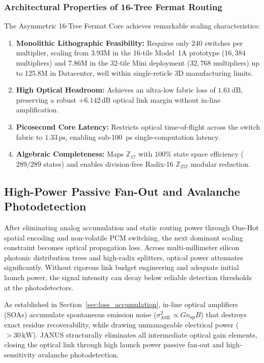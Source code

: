 \documentclass[journal]{IEEEtran}
\begin{document}
\subsubsection{\textbf{Architectural Properties of 16-Tree Fermat Routing}}
The Asymmetric 16-Tree Fermat Core achieves remarkable scaling characteristics:
\begin{enumerate}
\item \textbf{Monolithic Lithographic Feasibility:} Requires only 240 switches per multiplier, scaling from 3.93M in the 16-tile Model~1A prototype ($16,384$ multipliers) and 7.86M in the 32-tile Mini deployment ($32,768$ multipliers) up to 125.8M in Datacenter, well within single-reticle 3D manufacturing limits.
\item \textbf{High Optical Headroom:} Achieves an ultra-low fabric loss of $1.61\,\mathrm{dB}$, preserving a robust $+6.142\,\mathrm{dB}$ optical link margin without in-line amplification.
\item \textbf{Picosecond Core Latency:} Restricts optical time-of-flight across the switch fabric to $1.33\,\mathrm{ps}$, enabling sub-100~ps single-computation latency.
\item \textbf{Algebraic Completeness:} Maps $\mathbb{Z}_{17}$ with $100\%$ state space efficiency ($289/289$ states) and enables division-free Radix-16 $\mathbb{Z}_{257}$ modular reduction.
\end{enumerate}

\subsection{\textbf{High-Power Passive Fan-Out and Avalanche Photodetection}}
\label{sec:passive_fanout_apd}

After eliminating analog accumulation and static routing power through One-Hot spatial encoding and non-volatile PCM switching, the next dominant scaling constraint becomes optical propagation loss. Across multi-millimeter silicon photonic distribution trees and high-radix splitters, optical power attenuates significantly. Without rigorous link budget engineering and adequate initial launch power, the signal intensity can decay below reliable detection thresholds at the photodetectors.

As established in Section~\ref{sec:loss_accumulation}, in-line optical amplifiers (SOAs) accumulate spontaneous emission noise ($\sigma_{\mathrm{ASE}}^2 \propto G n_{\mathrm{sp}} B$) that destroys exact residue recoverability, while drawing unmanageable electrical power ($>30\,\mathrm{kW}$). JANUS structurally eliminates all intermediate optical gain elements, closing the optical link through high launch power passive fan-out and high-sensitivity avalanche photodetection.
\end{document}
